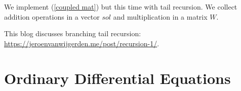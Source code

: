 \documentclass[a4paper,12pt]{article}
\begin{document}
\begin{pythonn}
    We implement (\ref{coupled mat}) but this time with tail recursion.
    We collect addition operations in a vector $sol$ and multiplication
    in a matrix $W$.
    \vspace{0.3cm}
\end{pythonn}


%


\begin{related}
    This blog discusses branching tail recursion:
    \url{https://jeroenvanwijgerden.me/post/recursion-1/}.
\end{related}


\section{Ordinary Differential Equations }

%
%
\end{document}
